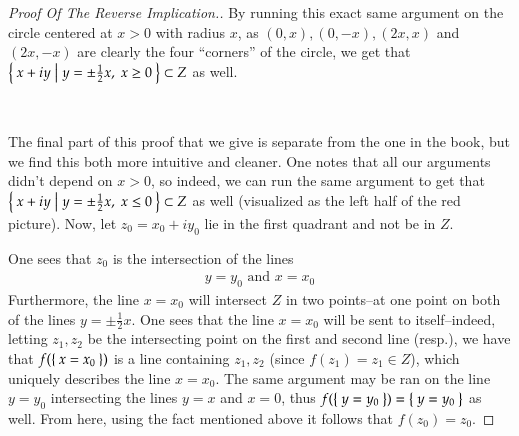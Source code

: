 \documentclass[12pt]{article}
\theoremstyle{definitionstyle}
\begin{document}
\begin{proof}[Proof Of The Reverse Implication.]
		By running this exact same argument on the circle centered at $x > 0$ with radius $x$, as $(0, x), (0, -x), (2x, x)$ and $(2x, -x)$ are clearly the four ``corners'' of the circle, we get that $\Set{x + iy | y = \pm \frac12 x, \; x \geq 0} \subset Z$ as well.
		
		
		$\quad \quad \quad \quad \quad \quad \quad \quad \quad$
		
		The final part of this proof that we give is separate from the one in the book, but we find this both more intuitive and cleaner. One notes that all our arguments didn't depend on $x > 0$, so indeed, we can run the same argument to get that $\Set{x+iy | y=\pm \frac12 x,\; x \leq 0} \subset Z$ as well (visualized as the left half of the red picture). Now, let $z_0 = x_0 + iy_0$ lie in the first quadrant and not be in $Z$.
		
		One sees that $z_0$ is the intersection of the lines
		\begin{align*}
			y = y_0 \text{ and } x = x_0
		\end{align*}
		Furthermore, the line $x = x_0$ will intersect $Z$ in two points--at one point on both of the lines $y = \pm \frac12 x$. One sees that the line $x = x_0$ will be sent to itself--indeed, letting $z_1, z_2$ be the intersecting point on the first and second line (resp.), we have that $f(\Set{x=x_0})$ is a line containing $z_1, z_2$ (since $f(z_1) = z_1 \in Z$), which uniquely describes the line $x = x_0$. The same argument may be ran on the line $y = y_0$ intersecting the lines $y = x$ and $x = 0$, thus $f(\Set{y = y_0}) = \Set{y = y_0}$ as well. From here, using the fact mentioned above it follows that $f(z_0) = z_0$. 
		

\end{proof}
\end{document}
